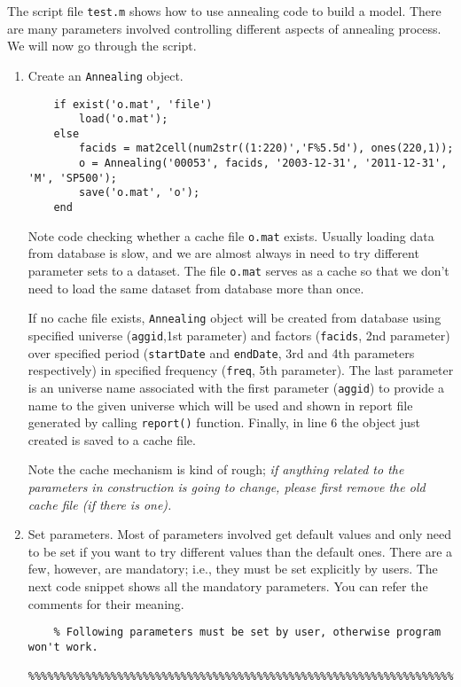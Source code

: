 \documentclass[10pt,oneside,a4paper]{article}
\begin{document}
The script file \texttt{test.m} shows how to use annealing code to build a model.
There are many parameters involved controlling different aspects of annealing process.
We will now go through the script.

\begin{enumerate}
    \item Create an \texttt{Annealing} object.
\begin{lstlisting}
	if exist('o.mat', 'file')
	    load('o.mat');
	else
	    facids = mat2cell(num2str((1:220)','F%5.5d'), ones(220,1));
	    o = Annealing('00053', facids, '2003-12-31', '2011-12-31', 'M', 'SP500');
	    save('o.mat', 'o');
	end
\end{lstlisting}

Note code checking whether a cache file \texttt{o.mat} exists. 
Usually loading data from database is slow,
and we are almost always in need to try different parameter sets to a dataset.
The file \texttt{o.mat} serves as a cache so that we don't need to load the same dataset from database more than once.

If no cache file exists, \texttt{Annealing} object will be created from database using
specified universe (\texttt{aggid},1st parameter) and factors (\texttt{facids}, 2nd parameter) 
over specified period (\texttt{startDate} and \texttt{endDate}, 3rd and 4th parameters respectively)
in specified frequency (\texttt{freq}, 5th parameter).
The last parameter is an universe name associated with the first parameter (\texttt{aggid})
to provide a name to the given universe which will be used and shown in report file
generated by calling \texttt{report()} function.
Finally, in line 6 the object just created is saved to a cache file.

Note the cache mechanism is kind of rough;
\emph{if anything related to the parameters in construction is going to change,
please first remove the old cache file (if there is one).}

    \item Set parameters. 
    Most of parameters involved get default values and only need to be set if you want to try different values than the 
    default ones.
    There are a few, however, are mandatory; i.e., they must be set explicitly by users.
    The next code snippet shows all the mandatory parameters. You can refer the comments for their meaning.

\begin{lstlisting}[firstnumber=last]
	%%%%%%%%%%%%%%%%%%%%%%%%%%%%%%%%%%%%%%%%%%%%%%%%%%%%%%%%%%%%%%%%%%%%%%%%%%%%
	% Following parameters must be set by user, otherwise program won't work.
	%%%%%%%%%%%%%%%%%%%%%%%%%%%%%%%%%%%%%%%%%%%%%%%%%%%%%%%%%%%%%%%%%%%%%%%%%%%%
	

\end{lstlisting}
\end{enumerate}
\end{document}
